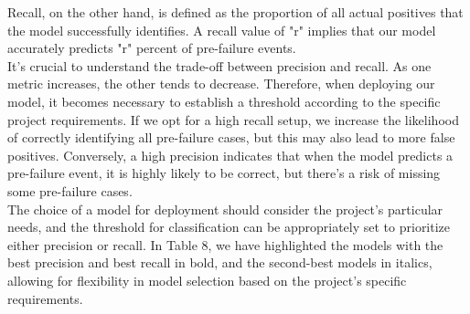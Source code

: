 \documentclass{article}
\begin{document}
Recall, on the other hand, is defined as the proportion of all actual positives that the model successfully identifies. A recall value of "r" implies that our model accurately predicts "r" percent of pre-failure events.\\

It's crucial to understand the trade-off between precision and recall. As one metric increases, the other tends to decrease. Therefore, when deploying our model, it becomes necessary to establish a threshold according to the specific project requirements. If we opt for a high recall setup, we increase the likelihood of correctly identifying all pre-failure cases, but this may also lead to more false positives. Conversely, a high precision indicates that when the model predicts a pre-failure event, it is highly likely to be correct, but there's a risk of missing some pre-failure cases.\\

The choice of a model for deployment should consider the project's particular needs, and the threshold for classification can be appropriately set to prioritize either precision or recall. In Table 8, we have highlighted the models with the best precision and best recall in bold, and the second-best models in italics, allowing for flexibility in model selection based on the project's specific requirements.

\newpage



\end{document}
